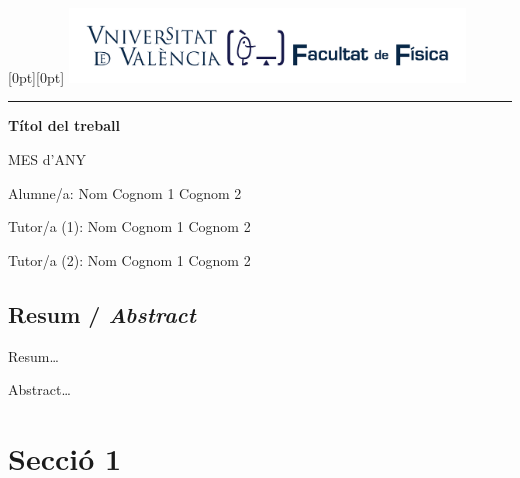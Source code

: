 \documentclass[12pt]{article}
\begin{document}

\begin{titlepage}
   \noindent\raisebox{0pt}[0pt][0pt]{
	\includegraphics[width=10.5cm]{marca-Facultat-Fisica-UV-1-linia.pdf}}\par
   \vspace{8.5cm}
   {\centering
      \par
      \rule{16.13cm}{1.5pt}\par
      \vspace{4.5cm}
      {\bfseries\sffamily\LARGE Títol del treball}\par
   }
   \vfill
   {\raggedleft\sffamily
		MES d'ANY\par
      \vspace{\baselineskip}
		Alumne/a: Nom Cognom 1 Cognom 2\par
      \vspace{\baselineskip}
		Tutor/a (1): Nom Cognom 1 Cognom 2\par
		Tutor/a (2): Nom Cognom 1 Cognom 2\par
   }
\end{titlepage}
\restoregeometry


\subsection*{Resum / \emph{Abstract}}

Resum\ldots

\vspace{\baselineskip}

\begin{otherlanguage}{english}\itshape

\noindent Abstract\ldots

\end{otherlanguage}


\section{Secció 1}
\end{document}
